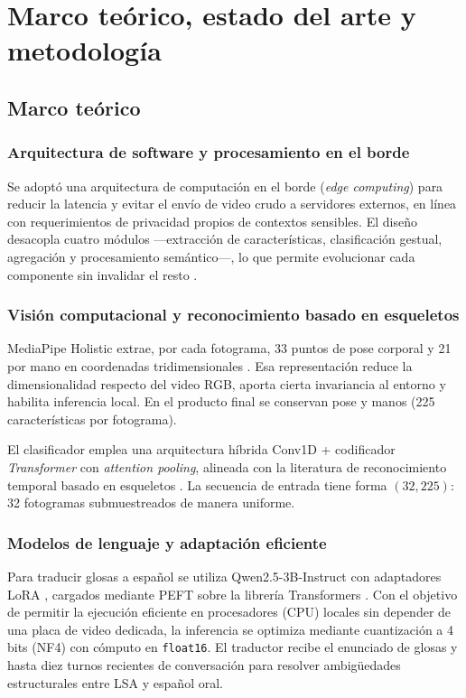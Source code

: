 \documentclass[12pt,a4paper]{report}
\begin{document}
\chapter{Marco teórico, estado del arte y metodología}
\section{Marco teórico}
\subsection{Arquitectura de software y procesamiento en el borde}
Se adoptó una arquitectura de computación en el borde (\textit{edge computing}) para reducir la latencia y evitar el envío de video crudo a servidores externos, en línea con requerimientos de privacidad propios de contextos sensibles. El diseño desacopla cuatro módulos ---extracción de características, clasificación gestual, agregación y procesamiento semántico---, lo que permite evolucionar cada componente sin invalidar el resto \parencite{pressman2014software}.

\subsection{Visión computacional y reconocimiento basado en esqueletos}
MediaPipe Holistic extrae, por cada fotograma, 33 puntos de pose corporal y 21 por mano en coordenadas tridimensionales \parencite{google2020mediapipe}. Esa representación reduce la dimensionalidad respecto del video RGB, aporta cierta invariancia al entorno y habilita inferencia local. En el producto final se conservan pose y manos (225 características por fotograma).

El clasificador emplea una arquitectura híbrida Conv1D + codificador \textit{Transformer} con \textit{attention pooling}, alineada con la literatura de reconocimiento temporal basado en esqueletos \parencite{vaswani2017attention,wu2020lite}. La secuencia de entrada tiene forma $(32, 225)$: 32 fotogramas submuestreados de manera uniforme.

\subsection{Modelos de lenguaje y adaptación eficiente}
Para traducir glosas a español se utiliza Qwen2.5-3B-Instruct \parencite{qwen2024qwen25} con adaptadores LoRA \parencite{hu2022lora}, cargados mediante PEFT sobre la librería Transformers \parencite{huggingface2024transformers}. Con el objetivo de permitir la ejecución eficiente en procesadores (CPU) locales sin depender de una placa de video dedicada, la inferencia se optimiza mediante cuantización a 4 bits (NF4) con cómputo en \texttt{float16}. El traductor recibe el enunciado de glosas y hasta diez turnos recientes de conversación para resolver ambigüedades estructurales entre LSA y español oral.
\end{document}
